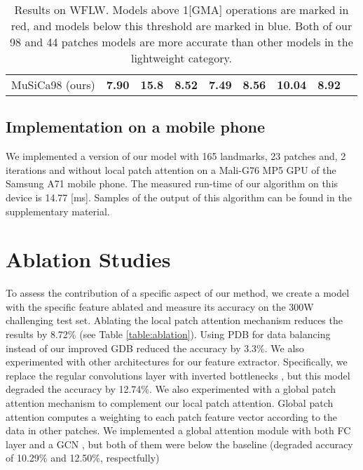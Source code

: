 \documentclass[twocolumn]{article}
\begin{document}
\begin{table*}[]
\begin{tabular}{@{}lcccccccl@{}}
MuSiCa98 (ours)     & \textbf{7.90}               & \textbf{15.8}                                         & \textbf{8.52}                                               & \textbf{7.49}                                                 & \textbf{8.56}                                            & \textbf{10.04}                                             & \textbf{8.92}                                         & \cellcolor[HTML]{0000FF}                       
\end{tabular}
\caption{Results on WFLW. Models above 1[GMA] operations are marked in red, and models below this threshold are marked in blue. Both of our 98 and 44 patches models are more accurate than other models in the lightweight category.}
\label{table:wflw}
\end{table*}
\subsection{Implementation on a mobile phone}

We implemented a version of our model with 165 landmarks, 23 patches and, 2 iterations and without local patch attention on a Mali-G76 MP5 GPU of the Samsung A71 mobile phone. The measured run-time of our algorithm on this device is 14.77 [ms]. Samples of the output of this algorithm can be found in the supplementary material.


\section{Ablation Studies}

To assess the contribution of a specific aspect of our method, we create a model with the specific feature ablated and measure its accuracy on the 300W challenging test set. Ablating the local patch attention mechanism reduces the results by 8.72\% (see Table \ref{table:ablation}). Using PDB \cite{feng2018wing} for data balancing instead of our improved GDB reduced the accuracy by 3.3\%.
We also experimented with other architectures for our feature extractor. Specifically, we replace the regular convolutions layer with inverted bottlenecks \cite{sandler2018mobilenetv2}, but this model degraded the accuracy by 12.74\%. We also experimented with a global patch attention mechanism to complement our local patch attention. Global patch attention computes a weighting to each patch feature vector according to the data in other patches. We implemented a global attention module with both FC layer and a GCN \cite{kipf2016semi}, but both of them were below the baseline (degraded accuracy of 10.29\% and 12.50\%, respectfully)
\end{document}
